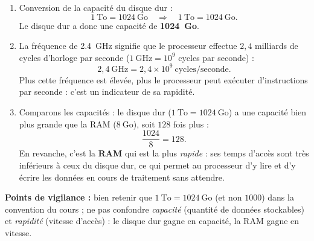 \documentclass[11pt]{article}
\newcommand{\cle}[1]{{\popxbold\color{popdark}#1}}
\begin{document}
\begin{corrige}
\begin{enumerate}
\item Conversion de la capacité du disque dur :
\[ 1\ \text{To} = 1024\ \text{Go} \quad \Longrightarrow \quad 1\ \text{To} = 1024\ \text{Go}. \]
Le disque dur a donc une capacité de \textbf{\SI{1024}{Go}}.
\item La fréquence de \SI{2,4}{GHz} signifie que le processeur effectue $2,4$ milliards de cycles d'horloge par seconde ($1\ \text{GHz} = 10^9$ cycles par seconde) :
\[ 2,4\ \text{GHz} = 2,4 \times 10^9\ \text{cycles/seconde}. \]
Plus cette fréquence est élevée, plus le processeur peut exécuter d'instructions par seconde : c'est un indicateur de sa \cle{rapidité}.
\item Comparons les capacités : le disque dur ($1\ \text{To} = 1024\ \text{Go}$) a une capacité bien plus grande que la RAM ($8\ \text{Go}$), soit $128$ fois plus :
\[ \frac{1024}{8} = 128. \]
En revanche, c'est la \textbf{RAM} qui est la plus \emph{rapide} : ses temps d'accès sont très inférieurs à ceux du disque dur, ce qui permet au processeur d'y lire et d'y écrire les données en cours de traitement sans attendre.
\end{enumerate}
\textbf{Points de vigilance :} bien retenir que $1\ \text{To} = 1024\ \text{Go}$ (et non $1000$) dans la convention du cours ; ne pas confondre \emph{capacité} (quantité de données stockables) et \emph{rapidité} (vitesse d'accès) : le disque dur gagne en capacité, la RAM gagne en vitesse.
\end{corrige}
\end{document}
